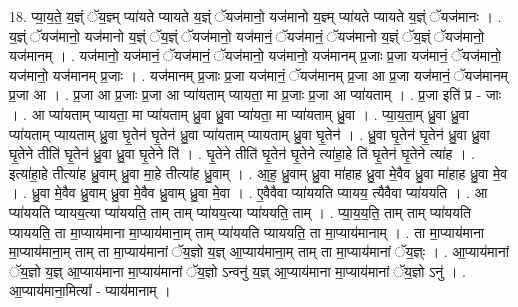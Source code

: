 \documentclass[17pt]{extarticle}
\begin{document}
18. प्या॒य॒ते॒ य॒ज्ञ्ं ॅय॒ज्ञ्म् प्या॑यते प्यायते य॒ज्ञ्ं ॅयज॑मानो॒ यज॑मानो य॒ज्ञ्म् प्या॑यते प्यायते य॒ज्ञ्ं ॅयज॑मानः । . य॒ज्ञ्ं ॅयज॑मानो॒ यज॑मानो य॒ज्ञ्ं ॅय॒ज्ञ्ं ॅयज॑मानो॒ यज॑मानं॒ ॅयज॑मानं॒ ॅयज॑मानो य॒ज्ञ्ं ॅय॒ज्ञ्ं ॅयज॑मानो॒ यज॑मानम् । . यज॑मानो॒ यज॑मानं॒ ॅयज॑मानं॒ ॅयज॑मानो॒ यज॑मानो॒ यज॑मानम् प्र॒जाः प्र॒जा यज॑मानं॒ ॅयज॑मानो॒ यज॑मानो॒ यज॑मानम् प्र॒जाः । . यज॑मानम् प्र॒जाः प्र॒जा यज॑मानं॒ ॅयज॑मानम् प्र॒जा आ प्र॒जा यज॑मानं॒ ॅयज॑मानम् प्र॒जा आ । . प्र॒जा आ प्र॒जाः प्र॒जा आ प्या॑यताम् प्यायता॒ मा प्र॒जाः प्र॒जा आ प्या॑यताम् । . प्र॒जा इति॑ प्र - जाः । . आ प्या॑यताम् प्यायता॒ मा प्या॑यताम् ध्रु॒वा ध्रु॒वा प्या॑यता॒ मा प्या॑यताम् ध्रु॒वा । . प्या॒य॒ता॒म् ध्रु॒वा ध्रु॒वा प्या॑यताम् प्यायताम् ध्रु॒वा घृ॒तेन॑ घृ॒तेन॑ ध्रु॒वा प्या॑यताम् प्यायताम् ध्रु॒वा घृ॒तेन॑ । . ध्रु॒वा घृ॒तेन॑ घृ॒तेन॑ ध्रु॒वा ध्रु॒वा घृ॒तेने तीति॑ घृ॒तेन॑ ध्रु॒वा ध्रु॒वा घृ॒तेने ति॑ । . घृ॒तेने तीति॑ घृ॒तेन॑ घृ॒तेने त्या॑हा॒हे ति॑ घृ॒तेन॑ घृ॒तेने त्या॑ह । . इत्या॑हा॒हे तीत्या॑ह ध्रु॒वाम् ध्रु॒वा मा॒हे तीत्या॑ह ध्रु॒वाम् । . आ॒ह॒ ध्रु॒वाम् ध्रु॒वा मा॑हाह ध्रु॒वा मे॒वैव ध्रु॒वा मा॑हाह ध्रु॒वा मे॒व । . ध्रु॒वा मे॒वैव ध्रु॒वाम् ध्रु॒वा मे॒वैव ध्रु॒वाम् ध्रु॒वा मे॒वा । . ए॒वैवैवा प्या॑ययति प्यायय॒ त्यैवैवा प्या॑ययति । . आ प्या॑ययति प्यायय॒त्या प्या॑ययति॒ ताम् ताम् प्या॑यय॒त्या प्या॑ययति॒ ताम् । . प्या॒य॒य॒ति॒ ताम् ताम् प्या॑ययति प्याययति॒ ता मा॒प्याय॑माना मा॒प्याय॑माना॒म् ताम् प्या॑ययति प्याययति॒ ता मा॒प्याय॑मानाम् । . ता मा॒प्याय॑माना मा॒प्याय॑माना॒म् ताम् ता मा॒प्याय॑मानां ॅय॒ज्ञो य॒ज्ञ् आ॒प्याय॑माना॒म् ताम् ता मा॒प्याय॑मानां ॅय॒ज्ञ्ः । . आ॒प्याय॑मानां ॅय॒ज्ञो य॒ज्ञ् आ॒प्याय॑माना मा॒प्याय॑मानां ॅय॒ज्ञो ऽन्वनु॑ य॒ज्ञ् आ॒प्याय॑माना मा॒प्याय॑मानां ॅय॒ज्ञो ऽनु॑ । . आ॒प्याय॑माना॒मित्या᳚ - प्याय॑मानाम् । \newline
\end{document}
